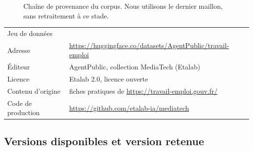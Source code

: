 \begin{figure}[htbp]
\centering
{}
\caption{Chaîne de provenance du corpus. Nous utilisons le dernier maillon, sans retraitement à ce stade.}
\label{fig:provenance}
\end{figure}

\begin{tabletype}
\begin{tabularx}{\textwidth}{@{}L{4cm}Y@{}}
\toprule
{} &  \\
\midrule
Jeu de données &  \\
Adresse & \url{https://huggingface.co/datasets/AgentPublic/travail-emploi} \\
Éditeur & AgentPublic, collection MediaTech (Etalab) \\
Licence & Etalab 2.0, licence ouverte \\
Contenu d'origine & fiches pratiques de \url{https://travail-emploi.gouv.fr/} \\
Code de production & \url{https://github.com/etalab-ia/mediatech} \\
\bottomrule
\end{tabularx}
\end{tabletype}

\subsection{Versions disponibles et version retenue}

